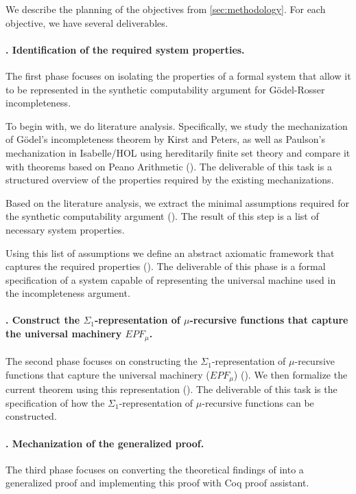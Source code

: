 \documentclass[a4paper]{scrartcl}
\begin{document}
We describe the planning of the objectives from \cref{sec:methodology}. For each objective, we have several deliverables.
\paragraph{. Identification of the required system properties.}

The first phase focuses on isolating the properties of a formal system that allow it to be represented in the synthetic computability argument for Gödel-Rosser incompleteness.

To begin with, we do literature analysis. Specifically, we study the mechanization of Gödel's incompleteness theorem by Kirst and Peters, as well as Paulson's mechanization in Isabelle/HOL using hereditarily finite set theory and compare it with theorems based on Peano Arithmetic (). The deliverable of this task is a structured overview of the properties required by the existing mechanizations.

Based on the literature analysis, we extract the minimal assumptions required for the synthetic computability argument (). The result of this step is a list of necessary system properties.

Using this list of assumptions we define an abstract axiomatic framework that captures the required properties (). The deliverable of this phase is a formal specification of a system capable of representing the universal machine used in the incompleteness argument.

\paragraph{. Construct the $\Sigma_1$-representation of $\mu$-recursive functions that capture the universal machinery $EPF_\mu$.}
The second phase focuses on constructing the $\Sigma_1$-representation of $\mu$-recursive functions that capture the universal machinery ($EPF_\mu$) (). We then formalize the current theorem using this representation (). The deliverable of this task is the specification of how the $\Sigma_1$-representation of $\mu$-recursive functions can be constructed.

\paragraph{. Mechanization of the generalized proof.}

The third phase focuses on converting the theoretical findings of  into a generalized proof and implementing this proof with Coq proof assistant.
\end{document}
